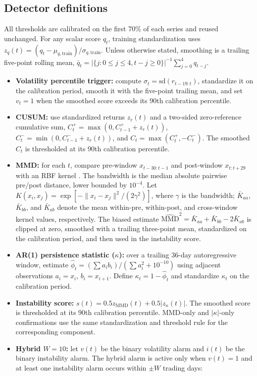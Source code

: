 \documentclass[10pt,twocolumn]{article}
\begin{document}
\subsection{Detector definitions}
All thresholds are calibrated on the first 70\% of each series and reused unchanged. For any scalar score $q_t$, training standardization uses $z_q(t)=(q_t-\mu_{q,\mathrm{train}})/\sigma_{q,\mathrm{train}}$. Unless otherwise stated, smoothing is a trailing five-point rolling mean, $\bar q_t=|\{j:0\leq j\leq4,t-j\geq0\}|^{-1}\sum_{j=0}^{4}q_{t-j}$.
\begin{itemize}
\item \textbf{Volatility percentile trigger:} compute $\sigma_t=\mathrm{sd}(r_{t-19:t})$, standardize it on the calibration period, smooth it with the five-point trailing mean, and set $v_t=1$ when the smoothed score exceeds its 90th calibration percentile.
\item \textbf{CUSUM:} use standardized returns $z_r(t)$ and a two-sided zero-reference cumulative sum, $C_t^+=\max(0,C_{t-1}^+ + z_r(t))$, $C_t^-=\min(0,C_{t-1}^- + z_r(t))$, and $C_t=\max(C_t^+,-C_t^-)$. The smoothed $C_t$ is thresholded at its 90th calibration percentile.
\item \textbf{MMD:} for each $t$, compare pre-window $x_{t-30:t-1}$ and post-window $x_{t:t+29}$ with an RBF kernel \cite{gretton2012}. The bandwidth is the median absolute pairwise pre/post distance, lower bounded by $10^{-4}$. Let $K(x_i,x_j)=\exp[-\|x_i-x_j\|^2/(2\gamma^2)]$, where $\gamma$ is the bandwidth; $\bar K_{aa}$, $\bar K_{bb}$, and $\bar K_{ab}$ denote the mean within-pre, within-post, and cross-window kernel values, respectively. The biased estimate $\widehat{\mathrm{MMD}}^2=\bar K_{aa}+\bar K_{bb}-2\bar K_{ab}$ is clipped at zero, smoothed with a trailing three-point mean, standardized on the calibration period, and then used in the instability score.
\item \textbf{AR(1) persistence statistic ($\kappa$):} over a trailing 36-day autoregressive window, estimate $\widehat\phi_t=(\sum a_i b_i)/(\sum a_i^2+10^{-10})$ using adjacent observations $a_i=x_i$, $b_i=x_{i+1}$. Define $\kappa_t=1-\widehat\phi_t$ and standardize $\kappa_t$ on the calibration period.
\item \textbf{Instability score:} $s(t)=0.5z_{\mathrm{MMD}}(t)+0.5|z_\kappa(t)|$. The smoothed score is thresholded at its 90th calibration percentile. MMD-only and $|\kappa|$-only confirmations use the same standardization and threshold rule for the corresponding component.
\item \textbf{Hybrid $W=10$:} let $v(t)$ be the binary volatility alarm and $i(t)$ be the binary instability alarm. The hybrid alarm is active only when $v(t)=1$ and at least one instability alarm occurs within $\pm W$ trading days:

\end{itemize}
\end{document}
